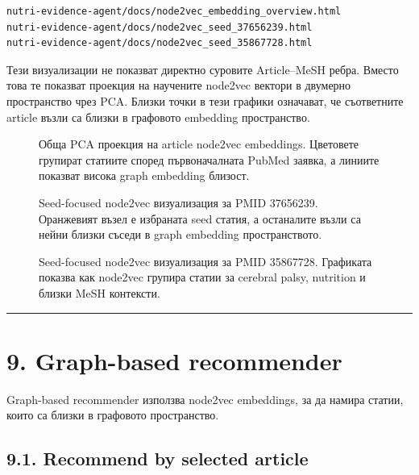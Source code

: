 \documentclass[12pt,a4paper]{article}
\begin{document}
\begin{verbatim}
nutri-evidence-agent/docs/node2vec_embedding_overview.html
nutri-evidence-agent/docs/node2vec_seed_37656239.html
nutri-evidence-agent/docs/node2vec_seed_35867728.html
\end{verbatim}

Тези визуализации не показват директно суровите Article--MeSH ребра. Вместо това те показват проекция на научените node2vec вектори в двумерно пространство чрез PCA. Близки точки в тези графики означават, че съответните article възли са близки в графовото embedding пространство.

\begin{figure}[H]
\centering

\caption{Обща PCA проекция на article node2vec embeddings. Цветовете групират статиите според първоначалната PubMed заявка, а линиите показват висока graph embedding близост.}
\label{fig:node2vec-overview}
\end{figure}

\begin{figure}[H]
\centering

\caption{Seed-focused node2vec визуализация за PMID 37656239. Оранжевият възел е избраната seed статия, а останалите възли са нейни близки съседи в graph embedding пространството.}
\label{fig:node2vec-seed-37656239}
\end{figure}

\begin{figure}[H]
\centering

\caption{Seed-focused node2vec визуализация за PMID 35867728. Графиката показва как node2vec групира статии за cerebral palsy, nutrition и близки MeSH контексти.}
\label{fig:node2vec-seed-35867728}
\end{figure}

\vspace{0.5em}\hrule\vspace{1.0em}

\section{9. Graph-based recommender}

Graph-based recommender използва node2vec embeddings, за да намира статии, които са близки в графовото пространство.

\subsection{9.1. Recommend by selected article}
\end{document}
